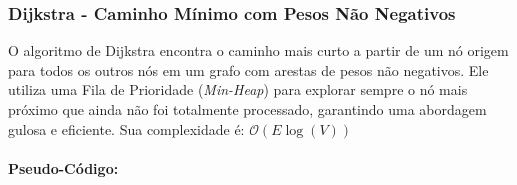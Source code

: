 \subsubsection{Dijkstra - Caminho Mínimo com Pesos Não Negativos}
O algoritmo de Dijkstra encontra o caminho mais curto a partir de um nó origem
para todos os outros nós em um grafo com arestas de pesos não negativos. Ele
utiliza uma Fila de Prioridade (\textit{Min-Heap}) para explorar sempre o nó
mais próximo que ainda não foi totalmente processado, garantindo uma abordagem
gulosa e eficiente. Sua complexidade é: $\mathcal{O}(E \log(V))$

\paragraph{Pseudo-Código: }\mbox{}\\
\begin{algorithm}[H]
	\SetAlgoLined

	\caption{Algoritmo de Dijkstra}
\end{algorithm}

